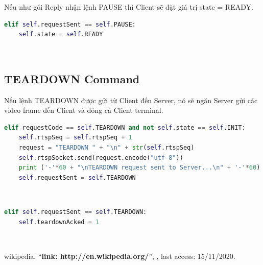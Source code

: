 \documentclass[a4paper]{article}
\begin{document}
\noindent Nếu như gói Reply nhận lệnh PAUSE thì Client sẽ đặt giá trị state = READY.

\begin{lstlisting}[language=Python]
elif self.requestSent == self.PAUSE:
    self.state = self.READY
\end{lstlisting}
\\

\subsection{TEARDOWN Command}

Nếu lệnh TEARDOWN được gửi từ Client đến Server, nó sẽ ngăn Server gửi các video frame đến Client và đóng cả Client terminal.

\begin{lstlisting}[language=Python]
elif requestCode == self.TEARDOWN and not self.state == self.INIT:
    self.rtspSeq = self.rtspSeq + 1
    request = "TEARDOWN " + "\n" + str(self.rtspSeq)
    self.rtspSocket.send(request.encode("utf-8"))
    print ('-'*60 + "\nTEARDOWN request sent to Server...\n" + '-'*60)
    self.requestSent = self.TEARDOWN
\end{lstlisting}
\\

\begin{lstlisting}[language=Python]
elif self.requestSent == self.TEARDOWN:
    self.teardownAcked = 1 
\end{lstlisting}
\\

\begin{thebibliography}{80}


 wikipedia.
``\textbf{link: http://en.wikipedia.org/}'',
\textit{}, last access: 15/11/2020.

\end{thebibliography}
\end{document}
